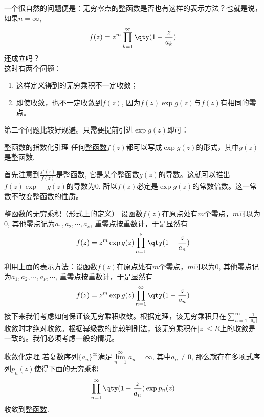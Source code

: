 \documentclass[UTF8]{ctexart}
\begin{document}
一个很自然的问题便是：无穷零点的整函数是否也有这样的表示方法？也就是说，如果$n=\infty$, 
\[f(z)=z^m\prod_{k=1}^{\infty}\qty(1-\frac{z}{a_k})\]
还成立吗？\\
这时有两个问题：\begin{enumerate}
    \item 这样定义得到的无穷乘积不一定收敛；
    \item 即使收敛，也不一定收敛到$f(z)$, 因为$f(z)\exp g(z)$与$f(z)$有相同的零点。
\end{enumerate}
第二个问题比较好规避。只需要提前引进$\exp g(z)$即可：
\begin{lma}
    {整函数的指数化引理}
    任何\hyperref[dfn:EntireFunction]{整函数}$f(z)$都可以写成$\exp g(z)$的形式，其中$g(z)$是整函数.
\end{lma}
\begin{prf}
    首先注意到$\frac{f'(z)}{f(z)}$是\hyperref[dfn:EntireFunction]{整函数}, 它是某个整函数$g(z)$的导数。这就可以推出$f(z)\exp -g(z)$的导数为0. 所以$f(z)$必定是$\exp g(z)$的常数倍数。这一常数不改变整函数的性质。
\end{prf}
\begin{dfn}
    {整函数的无穷乘积（形式上的定义）}
    设函数$f(z)$在原点处有$m$个零点，$m$可以为0, 其他零点记为$a_1,a_2,\cdots, a_\nu$, 重零点按重数计，于是显然有
    \[f(z)=z^m\exp g(z)\prod_{n=1}^{\nu}\qty(1-\frac{z}{a_n})\]
\end{dfn}
利用上面的表示方法：设函数$f(z)$在原点处有$m$个零点，$m$可以为0, 其他零点记为$a_1,a_2,\cdots, a_\nu, \cdots$, 重零点按重数计，于是显然有
\[f(z)=z^m\exp g(z)\prod_{n=1}^{\infty}\qty(1-\frac{z}{a_n})\]
接下来我们考虑如何保证该无穷乘积收敛。根据定理，该无穷乘积只在$\sum\limits_{n=1}^{\infty}\frac{1}{|a_n|}$收敛时才绝对收敛。根据幂级数的比较判别法，该无穷乘积在$|z|\leqslant R$上的收敛是一致的。我们必须考虑一般的情况。
\begin{thm}
    {收敛化定理}
    若复数序列$\{a_n\}^\infty$满足$\lim\limits_{n=1}^{\infty}a_n=\infty$, 其中$a_n\neq 0$, 那么就存在多项式序列$p_n(z)$使得下面的无穷乘积
    \[\prod_{n=1}^{\infty}\qty(1-\frac{z}{a_n})\exp p_n(z)\]
    收敛到\hyperref[dfn:EntireFunction]{整函数}.
\end{thm}
\end{document}
